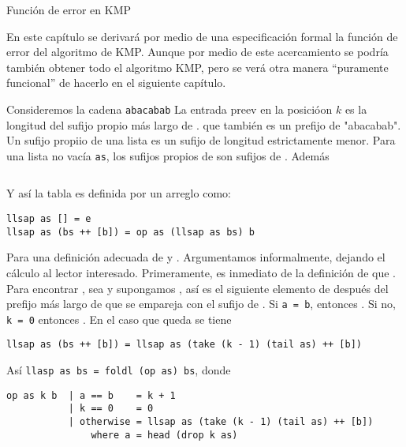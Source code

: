 Función de error en KMP

En este capítulo se derivará por medio de una especificación formal la función de error del algoritmo de KMP.
Aunque por medio de este acercamiento se podría también obtener todo el algoritmo KMP, %
pero se verá otra manera ``puramente funcional'' de hacerlo en el siguiente capítulo.

Consideremos la cadena \texttt{abacabab}
La entrada preev en la posicióon $k$ es la longitud del sufijo propio más largo de .
que también es un prefijo de "abacabab". Un sufijo propiio de una lista es un sufijo de longitud estrictamente menor.
Para una lista no vacía \texttt{as}, los sufijos propios de  son sufijos de
. Además


\inputminted{haskell}{codigo/haskell/failure-function-naive.hs}
Y así la tabla es definida por un arreglo como:

\begin{verbatim}
llsap as [] = e
llsap as (bs ++ [b]) = op as (llsap as bs) b
\end{verbatim}

Para una definición adecuada de  y . Argumentamos informalmente, dejando el cálculo al
lector interesado. %
Primeramente, es inmediato de la definición de  que . %
Para encontrar , sea  y supongamos , así 
es el siguiente elemento de  después del prefijo más largo de  que se empareja con el sufijo de .
Si \texttt{a = b}, entonces . Si no, \texttt{k = 0} entonces .
En el caso que queda se tiene

\begin{verbatim}
llsap as (bs ++ [b]) = llsap as (take (k - 1) (tail as) ++ [b])
\end{verbatim}

Así \texttt{llasp as bs = foldl (op as) bs}, donde
\begin{verbatim}
op as k b  | a == b    = k + 1
           | k == 0    = 0
           | otherwise = llsap as (take (k - 1) (tail as) ++ [b])
               where a = head (drop k as)
\end{verbatim}

